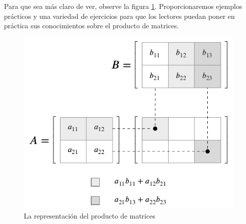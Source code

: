 \newpage
    
Para que sea más claro de ver, observe la figura \ref{bhfrfbhfbhh}. Proporcionaremos ejemplos prácticos y una variedad de ejercicios para que los lectores puedan poner en práctica sus conocimientos sobre el producto de matrices.
\begin{figure}[h!]
    \centering
    \includegraphics[scale=0.87]{Images/Capitulo2/ProdMatrices.pdf}
    \caption{La representación del producto de matrices}\label{bhfrfbhfbhh}
\end{figure}


